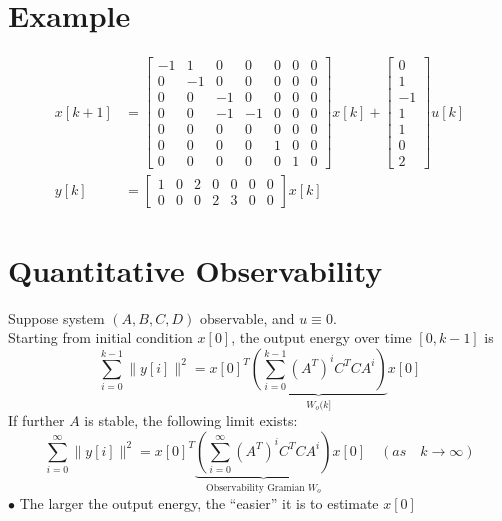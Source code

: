 \documentclass[10pt,a4paper,oneside]{article}
\begin{document}
\section{Example}
\[
\begin{aligned}
x[k+1]&=\left[\begin{array}{ccccccc}{-1} & {1} & {0} & {0} & {0} & {0} & {0} \\ {0} & {-1} & {0} & {0} & {0} & {0} & {0} \\ {0} & {0} & {-1} & {0} & {0} & {0} & {0} \\ {0} & {0} & {-1} & {-1} & {0} & {0} & {0} \\ {0} & {0} & {0} & {0} & {0} & {0} & {0} \\ {0} & {0} & {0} & {0} & {1} & {0} & {0} \\ {0} & {0} & {0} & {0} & {0} & {1} & {0}\end{array}\right]x[k]+\left[\begin{array}{c}{0} \\ {1} \\ {-1} \\ {1} \\ {1} \\ {0} \\ {2}\end{array}\right] u[k] \\ y[k]&=\left[\begin{array}{ccccccc}{1} & {0} & {2} & {0} & {0} & {0} & {0} \\ {0} & {0} & {0} & {2} & {3} & {0} & {0}\end{array}\right] x[k] \end{aligned}
\]
\section{Quantitative Observability}
Suppose system $(A, B, C, D)$ observable, and $u \equiv 0$.\\
Starting from initial condition $x[0]$, the output energy over time $[0, k-1]$ is
\[
\sum_{i=0}^{k-1}\|y[i]\|^{2}=x[0]^{T} \underbrace{\left(\sum_{i=0}^{k-1}\left(A^{T}\right)^{i} C^{T} C A^{i}\right)}_{W_{o}(k]} x[0]
\]
If further $A$ is stable, the following limit exists:
\[
\sum_{i=0}^{\infty}\|y[i]\|^{2}=x[0]^{T}\underbrace{\left(\sum_{i=0}^{\infty}\left(A^{T}\right)^{i} C^{T} C A^{i}\right)}_{\text{Observability Gramian $W_o$}} x[0] \quad(a s\quad k \rightarrow \infty)
\]
$\bullet$ The larger the output energy, the ``easier'' it is to estimate $x[0]$
\end{document}
